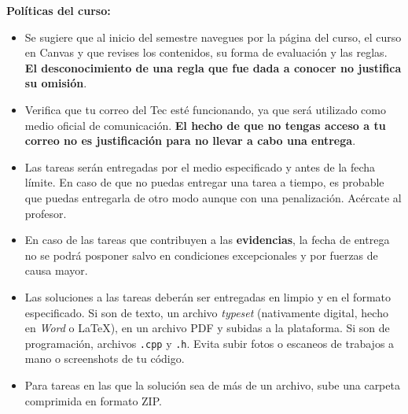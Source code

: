 \documentclass[12pt, letterpaper, oneside]{article}
\begin{document}
  \pagebreak
  \noindent\textbf{Políticas del curso:}  
  \begin{itemize}
  \item Se sugiere que al inicio del semestre navegues por la página del curso, el curso en Canvas y que revises los contenidos, su forma de evaluación y las reglas. \textbf{El desconocimiento de una regla que fue dada a conocer no justifica su omisión}.
  \item Verifica que tu correo del Tec esté funcionando, ya que será utilizado como medio oficial de comunicación. \textbf{El hecho de que no tengas acceso a tu correo no es justificación para no llevar a cabo una entrega}.
  \item Las tareas serán entregadas por el medio especificado y antes de la fecha límite. En caso de que no puedas entregar una tarea a tiempo, es probable que puedas entregarla de otro modo aunque con una penalización. Acércate al profesor.
  \item En caso de las tareas que contribuyen a las \textbf{evidencias}, la fecha de entrega no se podrá posponer salvo en condiciones excepcionales y por fuerzas de causa mayor.
  \item Las soluciones a las tareas deberán ser entregadas en limpio y en el formato especificado. Si son de texto, un archivo \textit{typeset} (nativamente digital, hecho en \textit{Word} o \LaTeX), en un archivo PDF y subidas a la plataforma. Si son de programación, archivos \texttt{.cpp} y \texttt{.h}. Evita subir fotos o escaneos de trabajos a mano o screenshots de tu código.
  \item Para tareas en las que la solución sea de más de un archivo, sube una carpeta comprimida en formato ZIP. 

\end{itemize}
\end{document}
